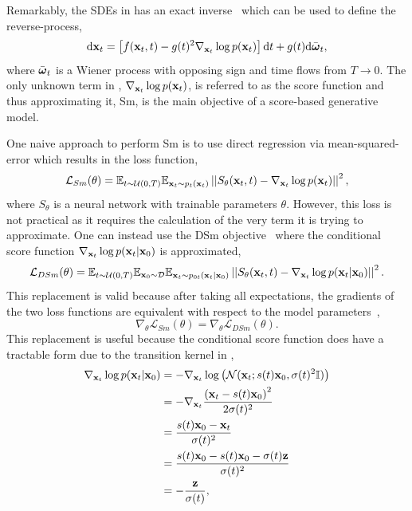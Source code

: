 Remarkably, the \Glspl{SDE} in  has an exact inverse~\cite{ReversetimeDiffusionEquation} which can be used to define the reverse-process,
\begin{equation}
    \label{eq:reverse_sde}
    \mathrm{d} \mathbf{x}_t = \left[ f(\mathbf{x}_t, t) - g(t)^2 \nabla_{\mathbf{x}_t} \log p(\mathbf{x}_t) \right] \mathrm{d} t + g(t) \mathrm{d} \bar{\boldsymbol{\omega}}_t,
\end{equation}
where $\bar{\boldsymbol{\omega}}_t$ is a Wiener process with opposing sign and time flows from $T \rightarrow 0$.
The only unknown term in , $\nabla_{\mathbf{x}_t} \log p(\mathbf{x}_t)$, is referred to as the score function and thus approximating it, \Gls{Sm}, is the main objective of a score-based generative model.

One naive approach to perform \Gls{Sm} is to use direct regression via mean-squared-error which results in the loss function,
\begin{equation}
    \label{eq:naive_loss}
    \mathcal{L}_{Sm}(\theta) =
    \mathbb{E}_{t \sim \mathcal{U}(0, T)}
    \mathbb{E}_{\mathbf{x}_t \sim p_t(\mathbf{x}_t)}
    \left|\left|S_\theta(\mathbf{x}_t, t) - \nabla_{\mathbf{x}_t} \log p(\mathbf{x}_t)\right|\right|^2,
\end{equation}
where $S_\theta$ is a neural network with trainable parameters $\theta$.
However, this loss is not practical as it requires the calculation of the very term it is trying to approximate.
One can instead use the \Gls{DSm} objective~\cite{ScoreMatching, SlicedScoreMatching} where the conditional score function $\nabla_{\mathbf{x}_t} \log p(\mathbf{x}_t|\mathbf{x}_0)$ is approximated,
\begin{equation}
    \label{eq:denoising_loss}
    \mathcal{L}_{DSm}(\theta) =
    \mathbb{E}_{t \sim \mathcal{U}(0, T)}
    \mathbb{E}_{\mathbf{x}_0 \sim \mathcal{D}}
    \mathbb{E}_{\mathbf{x}_t \sim p_{0t}(\mathbf{x}_t|\mathbf{x}_0)}
    \left|\left|S_\theta(\mathbf{x}_t, t) - \nabla_{\mathbf{x}_t} \log p(\mathbf{x}_t|\mathbf{x}_0)\right|\right|^2.
\end{equation}
This replacement is valid because after taking all expectations, the gradients of the two loss functions are equivalent with respect to the model parameters~\cite{ScoreBasedGenerativeModeling},
\begin{equation}
    \nabla_{\theta} \mathcal{L}_{Sm}(\theta) = \nabla_{\theta} \mathcal{L}_{DSm}(\theta).
\end{equation}
This replacement is useful because the conditional score function does have a tractable form due to the transition kernel in ,
\begin{equation}
    \begin{aligned}
        \label{eq:conditional_score}
        \nabla_{\mathbf{x}_t} \log p(\mathbf{x}_t|\mathbf{x}_0)
         & = -\nabla_{\mathbf{x}_t} \log \left( \mathcal{N}(\mathbf{x}_t; s(t)\mathbf{x}_0, \sigma(t)^2 \mathbb{I}) \right) \\
         & = -\nabla_{\mathbf{x}_t} \frac{\left(\mathbf{x}_t - s(t)\mathbf{x}_0\right)^2}{2\sigma(t)^2}                     \\
         & = \frac{s(t)\mathbf{x}_0 - \mathbf{x}_t}{\sigma(t)^2}                                                    \\
         & = \frac{s(t)\mathbf{x}_0 - s(t)\mathbf{x}_0 - \sigma(t)\mathbf{z}}{\sigma(t)^2}                                  \\
         & = - \frac{\mathbf{z}}{\sigma(t)},
    \end{aligned}
\end{equation}
